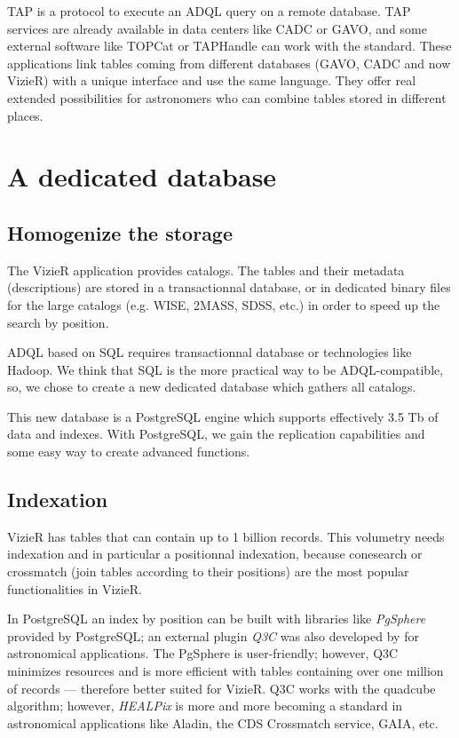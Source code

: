 TAP \citep{tap_2011} is a protocol to execute an ADQL query 
on a remote database. 
TAP services are already available in data centers like CADC or GAVO, and
some external software like TOPCat or TAPHandle can work with
the standard. These applications link tables coming from different databases
(GAVO, CADC and now VizieR) with a unique interface and use the same language.
They offer real extended possibilities for astronomers who can combine 
tables stored in different places. %


\section{A dedicated database}

\subsection{Homogenize the storage}
The VizieR application provides catalogs. The tables and their metadata (descriptions) 
are stored in a transactionnal database, or in dedicated binary files
for the large catalogs (e.g. WISE, 2MASS, SDSS, etc.) in order to speed up the 
search by position.

ADQL based on SQL requires 
transactionnal database or 
technologies like Hadoop. We think that SQL is the more practical way
to be ADQL-compatible, so, we chose to create a new dedicated database which
gathers all catalogs. 

This new database is a PostgreSQL engine which supports effectively 3.5 Tb
of data and indexes.
With PostgreSQL, we gain the replication capabilities and some easy way
to create advanced functions.

\subsection{Indexation}
VizieR has tables that can contain up to 1 billion records. This volumetry
needs indexation and in particular a positionnal indexation, because conesearch
or crossmatch (join tables according to their positions) are the most popular 
functionalities in VizieR.

In PostgreSQL an index by position can be built with libraries like {\em PgSphere}
provided by PostgreSQL; an external plugin {\em Q3C}
was also developed 
by \citet{q3c_2006} for astronomical applications.
The PgSphere is user-friendly; however, Q3C minimizes resources and
is more efficient with tables containing over one million of records ---
therefore better suited for VizieR.
Q3C works with the quadcube algorithm;
however, {\em HEALPix} is more and more becoming a standard in
astronomical applications like 
Aladin, the CDS Crossmatch service, GAIA, etc.


